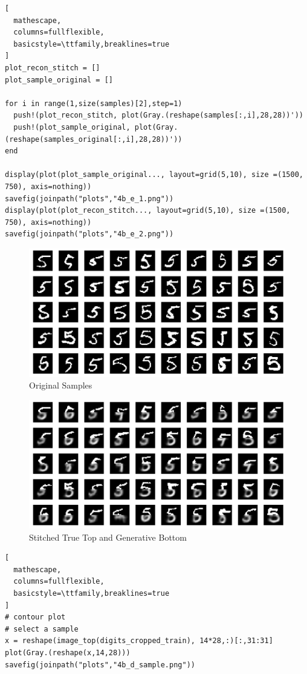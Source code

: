 \documentclass{article}
\begin{document}
\begin{enumerate}[label=(\alph*)]
\begin{lstlisting}[
  mathescape,
  columns=fullflexible,
  basicstyle=\ttfamily,breaklines=true
]
plot_recon_stitch = []
plot_sample_original = []

for i in range(1,size(samples)[2],step=1)
  push!(plot_recon_stitch, plot(Gray.(reshape(samples[:,i],28,28))'))
  push!(plot_sample_original, plot(Gray.(reshape(samples_original[:,i],28,28))'))
end

display(plot(plot_sample_original..., layout=grid(5,10), size =(1500, 750), axis=nothing))
savefig(joinpath("plots","4b_e_1.png"))
display(plot(plot_recon_stitch..., layout=grid(5,10), size =(1500, 750), axis=nothing))
savefig(joinpath("plots","4b_e_2.png"))
\end{lstlisting}

\begin{figure}[h]
  \centering
  \includegraphics[width=15cm]{plots/4b_e_1.png}
  \caption{Original Samples}
\end{figure}
\begin{figure}[h]
  \centering
  \includegraphics[width=15cm]{plots/4b_e_2.png}
  \caption{Stitched True Top and Generative Bottom}
\end{figure}

\pagebreak

\begin{lstlisting}[
  mathescape,
  columns=fullflexible,
  basicstyle=\ttfamily,breaklines=true
]
# contour plot
# select a sample
x = reshape(image_top(digits_cropped_train), 14*28,:)[:,31:31]
plot(Gray.(reshape(x,14,28)))
savefig(joinpath("plots","4b_d_sample.png"))


\end{lstlisting}
\end{enumerate}
\end{document}
